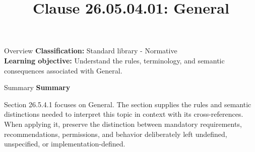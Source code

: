 \documentclass[10pt,letterpaper]{article}
\title{Clause 26.05.04.01: General}
\author{}
\date{}
\begin{document}
\maketitle
\begin{CornellOverviewBox}{Overview}
\textbf{Classification:} Standard library - Normative\\[2pt]
\textbf{Learning objective:} Understand the rules, terminology, and semantic consequences associated with General.
\end{CornellOverviewBox}\begin{CornellSummaryBox}{Summary}
{\sffamily\bfseries\color{Accent} Summary}\par\vspace{3pt}Section 26.5.4.1 focuses on General. The section supplies the rules and semantic distinctions needed to interpret this topic in context with its cross-references. When applying it, preserve the distinction between mandatory requirements, recommendations, permissions, and behavior deliberately left undefined, unspecified, or implementation-defined.
\end{CornellSummaryBox}
\end{document}
